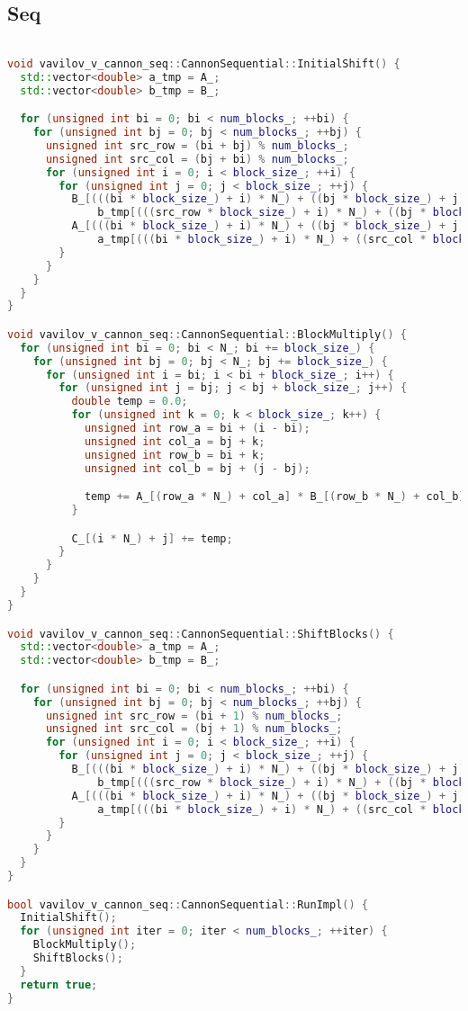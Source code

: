 \documentclass[a4paper,12pt]{article}
\begin{document}
\subsection{Seq}
\begin{lstlisting}[language=C++]

void vavilov_v_cannon_seq::CannonSequential::InitialShift() {
  std::vector<double> a_tmp = A_;
  std::vector<double> b_tmp = B_;

  for (unsigned int bi = 0; bi < num_blocks_; ++bi) {
    for (unsigned int bj = 0; bj < num_blocks_; ++bj) {
      unsigned int src_row = (bi + bj) % num_blocks_;
      unsigned int src_col = (bj + bi) % num_blocks_;
      for (unsigned int i = 0; i < block_size_; ++i) {
        for (unsigned int j = 0; j < block_size_; ++j) {
          B_[(((bi * block_size_) + i) * N_) + ((bj * block_size_) + j)] =
              b_tmp[(((src_row * block_size_) + i) * N_) + ((bj * block_size_) + j)];
          A_[(((bi * block_size_) + i) * N_) + ((bj * block_size_) + j)] =
              a_tmp[(((bi * block_size_) + i) * N_) + ((src_col * block_size_) + j)];
        }
      }
    }
  }
}

void vavilov_v_cannon_seq::CannonSequential::BlockMultiply() {
  for (unsigned int bi = 0; bi < N_; bi += block_size_) {
    for (unsigned int bj = 0; bj < N_; bj += block_size_) {
      for (unsigned int i = bi; i < bi + block_size_; i++) {
        for (unsigned int j = bj; j < bj + block_size_; j++) {
          double temp = 0.0;
          for (unsigned int k = 0; k < block_size_; k++) {
            unsigned int row_a = bi + (i - bi);
            unsigned int col_a = bj + k;
            unsigned int row_b = bi + k;
            unsigned int col_b = bj + (j - bj);

            temp += A_[(row_a * N_) + col_a] * B_[(row_b * N_) + col_b];
          }

          C_[(i * N_) + j] += temp;
        }
      }
    }
  }
}

void vavilov_v_cannon_seq::CannonSequential::ShiftBlocks() {
  std::vector<double> a_tmp = A_;
  std::vector<double> b_tmp = B_;

  for (unsigned int bi = 0; bi < num_blocks_; ++bi) {
    for (unsigned int bj = 0; bj < num_blocks_; ++bj) {
      unsigned int src_row = (bi + 1) % num_blocks_;
      unsigned int src_col = (bj + 1) % num_blocks_;
      for (unsigned int i = 0; i < block_size_; ++i) {
        for (unsigned int j = 0; j < block_size_; ++j) {
          B_[(((bi * block_size_) + i) * N_) + ((bj * block_size_) + j)] =
              b_tmp[(((src_row * block_size_) + i) * N_) + ((bj * block_size_) + j)];
          A_[(((bi * block_size_) + i) * N_) + ((bj * block_size_) + j)] =
              a_tmp[(((bi * block_size_) + i) * N_) + ((src_col * block_size_) + j)];
        }
      }
    }
  }
}

bool vavilov_v_cannon_seq::CannonSequential::RunImpl() {
  InitialShift();
  for (unsigned int iter = 0; iter < num_blocks_; ++iter) {
    BlockMultiply();
    ShiftBlocks();
  }
  return true;
}

\end{lstlisting}
\end{document}
